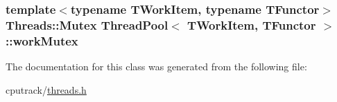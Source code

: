 \subsubsection[{\texorpdfstring{work\+Mutex}{workMutex}}]{\setlength{\rightskip}{0pt plus 5cm}template$<$typename T\+Work\+Item, typename T\+Functor$>$ {\bf Threads\+::\+Mutex} {\bf Thread\+Pool}$<$ T\+Work\+Item, T\+Functor $>$\+::work\+Mutex\hspace{0.3cm}{\ttfamily [protected]}}\hypertarget{class_thread_pool_ae889b134298a051739ae1bdfa211f6c9}{}\label{class_thread_pool_ae889b134298a051739ae1bdfa211f6c9}


The documentation for this class was generated from the following file\+:\begin{DoxyCompactItemize}
\item 
cputrack/\hyperlink{threads_8h}{threads.\+h}\end{DoxyCompactItemize}
